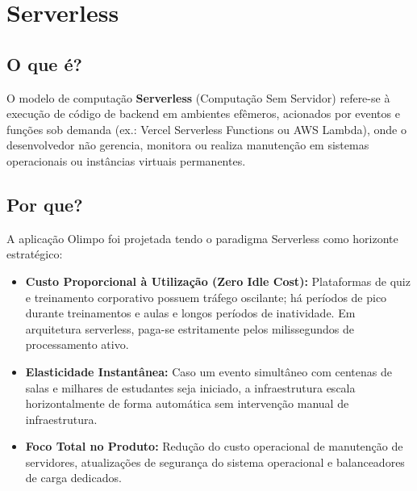 \documentclass[12pt,a4paper]{article}
\begin{document}
\section{Serverless}

\subsection{O que é?}
O modelo de computação \textbf{Serverless} (Computação Sem Servidor) refere-se à execução de código de backend em ambientes efêmeros, acionados por eventos e funções sob demanda (ex.: Vercel Serverless Functions ou AWS Lambda), onde o desenvolvedor não gerencia, monitora ou realiza manutenção em sistemas operacionais ou instâncias virtuais permanentes.

\subsection{Por que?}
A aplicação Olimpo foi projetada tendo o paradigma Serverless como horizonte estratégico:
\begin{itemize}
  \item \textbf{Custo Proporcional à Utilização (Zero Idle Cost):} Plataformas de quiz e treinamento corporativo possuem tráfego oscilante; há períodos de pico durante treinamentos e aulas e longos períodos de inatividade. Em arquitetura serverless, paga-se estritamente pelos milissegundos de processamento ativo.
  \item \textbf{Elasticidade Instantânea:} Caso um evento simultâneo com centenas de salas e milhares de estudantes seja iniciado, a infraestrutura escala horizontalmente de forma automática sem intervenção manual de infraestrutura.
  \item \textbf{Foco Total no Produto:} Redução do custo operacional de manutenção de servidores, atualizações de segurança do sistema operacional e balanceadores de carga dedicados.
\end{itemize}
\end{document}
